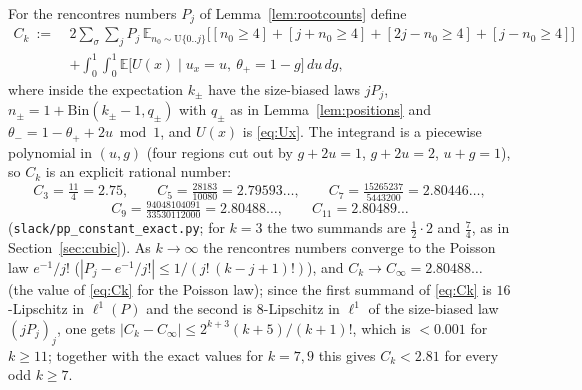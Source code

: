 For the rencontres numbers $P_j$ of Lemma~\ref{lem:rootcounts} define
\begin{equation}\label{eq:Ck}
\begin{aligned}
 C_k\ :=\ &2\sum_\sigma\sum_{j}P_j\,\mathbb E_{n_0\sim\mathrm U\{0..j\}}\bigl[[n_0\ge4]+[j+n_0\ge4]+[2j-n_0\ge4]+[j-n_0\ge4]\bigr]\\
 &+\int_0^1\!\!\int_0^1\mathbb E\bigl[U(x)\mid u_x=u,\ \theta_+=1-g\bigr]\,du\,dg ,
\end{aligned}
\end{equation}
where inside the expectation $k_\pm$ have the size-biased laws $jP_j$, $n_\pm=1+\mathrm{Bin}(k_\pm-1,q_\pm)$ with $q_\pm$ as in
Lemma~\ref{lem:positions} and $\theta_-=1-\theta_++2u\bmod1$, and $U(x)$ is \eqref{eq:Ux}.  The integrand is a piecewise polynomial in $(u,g)$ (four
regions cut out by $g+2u=1$, $g+2u=2$, $u+g=1$), so $C_k$ is an explicit rational number:
\[
 C_3=\tfrac{11}4=2.75,\qquad C_5=\tfrac{28183}{10080}=2.79593\ldots,\qquad C_7=\tfrac{15265237}{5443200}=2.80446\ldots,
\]
\[
 C_9=\tfrac{94048104091}{33530112000}=2.80488\ldots,\qquad C_{11}=2.80489\ldots
\]
(\texttt{slack/pp\_constant\_exact.py}; for $k=3$ the two summands are $\tfrac12\cdot2$ and $\tfrac74$, as in Section~\ref{sec:cubic}).  As
$k\to\infty$ the rencontres numbers converge to the Poisson law $e^{-1}/j!$ ($|P_j-e^{-1}/j!|\le1/(j!\,(k-j+1)!)$), and $C_k\to C_\infty=2.80488\ldots$
(the value of \eqref{eq:Ck} for the Poisson law); since the first summand of \eqref{eq:Ck} is $16$-Lipschitz in $\ell^1(P)$ and the second is
$8$-Lipschitz in $\ell^1$ of the size-biased law $(jP_j)_j$, one gets $|C_k-C_\infty|\le2^{k+3}(k+5)/(k+1)!$, which is $<0.001$ for $k\ge11$; together
with the exact values for $k=7,9$ this gives $C_k<2.81$ for every odd $k\ge7$.

